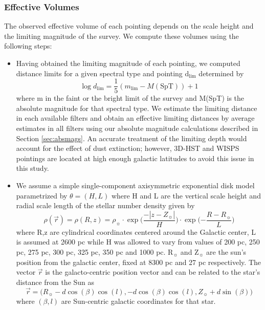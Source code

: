 \documentclass[manuscript]{aastex63}
\begin{document}
\subsubsection{ Effective Volumes}
The observed effective volume of each pointing depends on the scale height and the limiting magnitude of the survey. We compute these volumes using the following steps:
\begin{itemize}
\item Having obtained the limiting magnitude of each pointing, we computed distance limits for a given spectral type and pointing d$_{\text{lim}}$ determined by \begin{equation} \log d_{\text{lim}} =\frac{1}{5}(m_{\text{lim}}-M(\text{SpT}))+1 \end{equation}
where m in the faint or the bright limit of the survey and M(SpT) is the absolute magnitude for that spectral type. We estimate the limiting distance in each available filters and obtain an effective limiting distances by average estimates in all filters using our absolute magnitude calculations described in Section \ref{sec:absmags}. An accurate treatment of the limiting depth would account for the effect of dust extinction; however, 3D-HST and WISPS pointings are located at high enough galactic latitudes to avoid this issue in this study.

\item We assume a simple single-component axisymmetric exponential disk model parametrized by $\theta=(H, L)$ where H and L are the vertical scale height and radial scale length of the stellar number density given by
\begin{equation} \rho(\vec{r}) =\rho(R, z)= \rho _\sun \cdot \exp \biggl( {\frac{-|z-Z_\sun|}{H}} \biggl) \cdot \exp \biggl( {-\frac{R-R_\sun}{L}} \biggl)\end{equation} where R,z are cylindrical coordinates centered around the Galactic center, L is assumed at 2600 pc while H was allowed to vary from values of 200 pc, 250 pc,  275 pc,  300 pc,  325 pc,  350 pc and 1000 pc. R$_\sun$ and Z$_\sun$ are the sun's position from the galactic center, fixed at 8300 pc and 27 pc respectively. The vector $\vec{r}$ is the galacto-centric position vector and can be related to the star's distance from the Sun as \begin{equation} \vec{r} =  \biggl( R_\sun - d\cos(\beta) \cos(l), -d \cos(\beta) \cos(l), Z_\sun + d \sin (\beta)  \biggl) \end{equation} where $(\beta, l)$ are Sun-centric galactic coordinates for that star.


\end{itemize}
\end{document}
